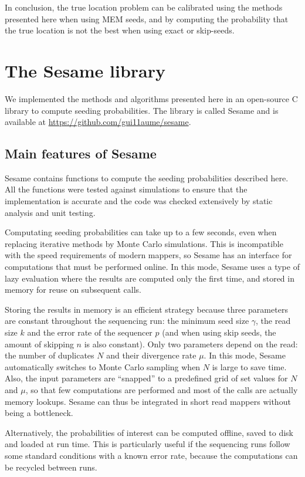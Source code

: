 \documentclass{article}
\begin{document}
In conclusion, the true location problem can be calibrated using the
methods presented here when using MEM seeds, and by computing the
probability that the true location is not the best when using exact or
skip-seeds.


\section{The Sesame library}
\label{sec:sesame}

We implemented the methods and algorithms presented here in an open-source
C library to compute seeding probabilities. The library is called Sesame
and is available at \url{https://github.com/gui11aume/sesame}.

\subsection{Main features of Sesame}

Sesame contains functions to compute the seeding probabilities described
here. All the functions were tested against simulations to ensure that the
implementation is accurate and the code was checked extensively by static
analysis and unit testing.

Computating seeding probabilities can take up to a few seconds, even when
replacing iterative methods by Monte Carlo simulations. This is
incompatible with the speed requirements of modern mappers, so Sesame has
an interface for computations that must be performed online. In this mode,
Sesame uses a type of lazy evaluation where the results are computed only
the first time, and stored in memory for reuse on subsequent calls.

Storing the results in memory is an efficient strategy because three
parameters are constant throughout the sequencing run: the minimum seed
size $\gamma$, the read size $k$ and the error rate of the sequencer $p$
(and when using skip seeds, the amount of skipping $n$ is also constant).
Only two parameters depend on the read: the number of duplicates $N$ and
their divergence rate $\mu$. In this mode, Sesame automatically switches
to Monte Carlo sampling when $N$ is large to save time. Also, the input
parameters are ``snapped'' to a predefined grid of set values for $N$ and
$\mu$, so that few computations are performed and most of the calls are
actually memory lookups. Sesame can thus be integrated in short read
mappers without being a bottleneck.

Alternatively, the probabilities of interest can be computed offline,
saved to disk and loaded at run time. This is particularly useful if the
sequencing runs follow some standard conditions with a known error rate,
because the computations can be recycled between runs.
\end{document}
